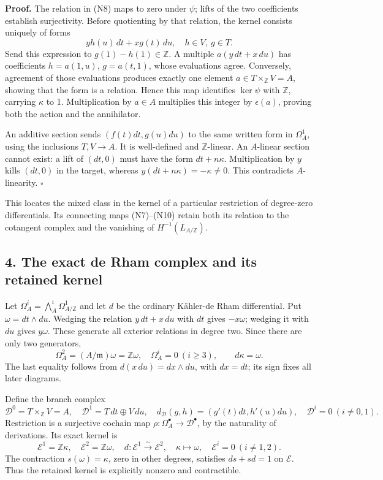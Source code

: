 \documentclass[
]{article}
\begin{document}
\textbf{Proof.} The relation in (N8) maps to zero under \(\psi\); lifts
of the two coefficients establish surjectivity. Before quotienting by
that relation, the kernel consists uniquely of forms \[
yh(u)\,dt+xg(t)\,du,\quad h\in V,\ g\in T.
\] Send this expression to \(g(1)-h(1)\in\mathbb Z\). A multiple
\(a(y\,dt+x\,du)\) has coefficients \(h=a(1,u)\), \(g=a(t,1)\), whose
evaluations agree. Conversely, agreement of those evaluations produces
exactly one element \(a\in T\times_{\mathbb Z}V=A\), showing that the
form is a relation. Hence this map identifies \(\ker\psi\) with
\(\mathbb Z\), carrying \(\kappa\) to 1. Multiplication by \(a\in A\)
multiplies this integer by \(\epsilon(a)\), proving both the action and
the annihilator.

An additive section sends \((f(t)dt,g(u)du)\) to the same written form
in \(\Omega^1_A\), using the inclusions \(T,V\to A\). It is well-defined
and \(\mathbb Z\)-linear. An \(A\)-linear section cannot exist: a lift
of \((dt,0)\) must have the form \(dt+n\kappa\). Multiplication by \(y\)
kills \((dt,0)\) in the target, whereas \(y(dt+n\kappa)=-\kappa\ne0\).
This contradicts \(A\)-linearity. \(\square\)

This locates the mixed class in the kernel of a particular restriction
of degree-zero differentials. Its connecting maps (N7)--(N10) retain
both its relation to the cotangent complex and the vanishing of
\(H^{-1}(L_{A/\mathbb Z})\).

\subsection{4. The exact de Rham complex and its retained
kernel}\label{the-exact-de-rham-complex-and-its-retained-kernel}

Let \(\Omega^i_A=\bigwedge^i_A\Omega^1_{A/\mathbb Z}\) and let \(d\) be
the ordinary Kähler-de Rham differential. Put \(\omega=dt\wedge du\).
Wedging the relation \(y\,dt+x\,du\) with \(dt\) gives \(-x\omega\);
wedging it with \(du\) gives \(y\omega\). These generate all exterior
relations in degree two. Since there are only two generators, \[
\Omega^2_A=(A/\mathfrak m)\omega=\mathbb Z\omega,
\quad \Omega^i_A=0\ (i\ge3),\qquad d\kappa=\omega.
\tag{N11}
\] The last equality follows from \(d(x\,du)=dx\wedge du\), with
\(dx=dt\); its sign fixes all later diagrams.

Define the branch complex \[
\mathcal D^0=T\times_{\mathbb Z}V=A,
\quad\mathcal D^1=T\,dt\oplus V\,du,
\quad d_{\mathcal D}(g,h)=(g'(t)dt,h'(u)du),
\quad\mathcal D^i=0\ (i\ne0,1).
\tag{N12}
\] Restriction is a surjective cochain map
\(\rho:\Omega^\bullet_A\to\mathcal D^\bullet\), by the naturality of
derivations. Its exact kernel is \[
\mathcal E^1=\mathbb Z\kappa,
\quad\mathcal E^2=\mathbb Z\omega,
\quad d:\mathcal E^1\xrightarrow{\sim}\mathcal E^2,
\quad\kappa\longmapsto\omega,
\quad\mathcal E^i=0\ (i\ne1,2).
\tag{N13}
\] The contraction \(s(\omega)=\kappa\), zero in other degrees,
satisfies \(ds+sd=1\) on \(\mathcal E\). Thus the retained kernel is
explicitly nonzero and contractible.
\end{document}
